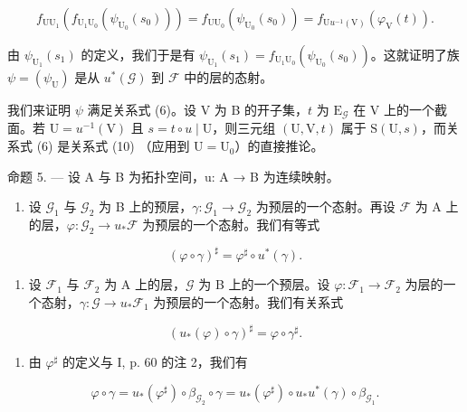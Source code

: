 \[
f_{\mathrm{U}\mathrm{U}_{1}}(f_{\mathrm{U}_{1}\mathrm{U}_{0}}(\psi_{\mathrm{U}_{0}}(s_{0}))) = f_{\mathrm{U}\mathrm{U}_{0}}(\psi_{\mathrm{U}_{0}}(s_{0})) = f_{\mathrm{U}u^{-1}(\mathrm{V})}(\varphi_{\mathrm{V}}(t)).
\]

由 \(\psi_{\mathrm{U}_{1}}(s_{1})\) 的定义，我们于是有 \(\psi_{\mathrm{U}_{1}}(s_{1}) = f_{\mathrm{U}_{1}\mathrm{U}_{0}}(\psi_{\mathrm{U}_{0}}(s_{0}))\)。这就证明了族 \(\psi = (\psi_{\mathrm{U}})\) 是从 \(u^{*}(\mathcal{G})\) 到 \(\mathcal{F}\) 中的层的态射。

我们来证明 \(\psi\) 满足关系式 (6)。设 V 为 B 的开子集，\(t\) 为 \(\mathrm{E}_{\mathcal{G}}\) 在 V 上的一个截面。若 \(\mathrm{U} = u^{-1}(\mathrm{V})\) 且 \(s = t \circ u \mid \mathrm{U}\)，则三元组 \((\mathrm{U}, \mathrm{V}, t)\) 属于 \(\mathrm{S}(\mathrm{U}, s)\)，而关系式 (6) 是关系式 (10) （应用到 \(\mathrm{U} = \mathrm{U}_0\)）的直接推论。

命题 5. — 设 A 与 B 为拓扑空间，u: A → B 为连续映射。

\begin{enumerate}
\def\labelenumi{\alph{enumi})}
\tightlist
\item
  设 \(\mathcal{G}_1\) 与 \(\mathcal{G}_2\) 为 B 上的预层，\(\gamma\colon\mathcal{G}_1\to\mathcal{G}_2\) 为预层的一个态射。再设 \(\mathcal{F}\) 为 A 上的层，\(\varphi\colon\mathcal{G}_2\to u_*\mathcal{F}\) 为预层的一个态射。我们有等式
\end{enumerate}

\[
(\varphi \circ \gamma) ^ {\sharp} = \varphi^ {\sharp} \circ u ^ {*} (\gamma).\tag{11}
\]

\begin{enumerate}
\def\labelenumi{\alph{enumi})}
\setcounter{enumi}{1}
\tightlist
\item
  设 \(\mathcal{F}_1\) 与 \(\mathcal{F}_2\) 为 A 上的层，\(\mathcal{G}\) 为 B 上的一个预层。设 \(\varphi\colon\mathcal{F}_1\to\mathcal{F}_2\) 为层的一个态射，\(\gamma\colon\mathcal{G}\to u_*\mathcal{F}_1\) 为预层的一个态射。我们有关系式
\end{enumerate}

\[
(u _ {*} (\varphi) \circ \gamma) ^ {\sharp} = \varphi \circ \gamma^ {\sharp}.
\]

\begin{enumerate}
\def\labelenumi{\alph{enumi})}
\tightlist
\item
  由 \(\varphi^{\sharp}\) 的定义与 I, p. 60 的注 2，我们有
\end{enumerate}

\[
\varphi \circ \gamma = u _ {*} (\varphi^ {\sharp}) \circ \beta_ {\mathcal {G} _ {2}} \circ \gamma = u _ {*} (\varphi^ {\sharp}) \circ u _ {*} u ^ {*} (\gamma) \circ \beta_ {\mathcal {G} _ {1}}.
\]

